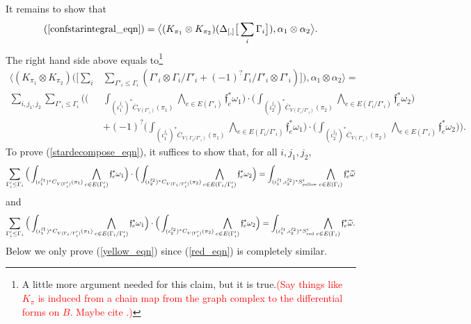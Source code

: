 \documentclass[11pt]{article}
\theoremstyle{definition}
\theoremstyle{remark}
\def\wt#1{\widetilde{#1}}
\def\ov#1{\overline{#1}}
\def\sred{{\textnormal{red}}}
\def\syellow{{\textnormal{yellow}}}
\def\ff{\mathfrak{f}}
\def\cmt#1{\textcolor{red}{(#1)}}
\begin{document}
It remains to show that 
\begin{equation}\label{stardecompose_eqn}
(\ref{confstarintegral_eqn})=\big\langle (K_{\pi_1}\otimes K_{\pi_2})(\Delta_{[,]}\big[\sum_{i}\Gamma_i\big]), \alpha_1\otimes\alpha_2 \big\rangle. 
\end{equation}
The right hand side above equals to\footnote{
A little more argument needed for this claim, but it is true.\cmt{Say things like $K_\pi$ is induced from a chain map from the graph complex to the differential forms on $B$. Maybe cite \cite[Theorem 2.15(1)]{WatanabeAddendum}.}} 
\begin{align*}
\big\langle (K_{\pi_1}\otimes K_{\pi_2})(\big[\sum_{i}&\sum_{\Gamma'_i\le\Gamma_i}(\Gamma'_i\otimes\Gamma_i/\Gamma'_i+(-1)^?\Gamma_i/\Gamma'_i\otimes\Gamma'_i)\big]), \alpha_1\otimes\alpha_2 \big\rangle=\\
\sum_{i,j_1,j_2}\sum_{\Gamma'_i\le\Gamma_i}
\bigg(\Big(&\int_{(\iota_1^{j_1})^*\ov{C}_{V(\Gamma'_i)}(\pi_1)}
\bigwedge_{e\in E(\Gamma'_i)}\ff_e^*\omega_1\Big)
\cdot
\Big(\int_{(\iota_2^{j_2})^*\ov{C}_{V(\Gamma_i/\Gamma'_i)}(\pi_2)}
\bigwedge_{e\in E(\Gamma_i/\Gamma'_i)}\ff_e^*\omega_2\Big)\\
&+(-1)^?
\Big(\int_{(\iota_1^{j_1})^*\ov{C}_{V(\Gamma_i/\Gamma'_i)}(\pi_1)}
\bigwedge_{e\in E(\Gamma_i/\Gamma'_i)}\ff_e^*\omega_1\Big)
\cdot
\Big(\int_{(\iota_2^{j_2})^*\ov{C}_{V(\Gamma'_i)}(\pi_2)}
\bigwedge_{e\in E(\Gamma'_i)}\ff_e^*\omega_2\Big)\bigg).
\end{align*}
To prove (\ref{stardecompose_eqn}), it suffices to show that, for all $i,j_1,j_2$, 
\begin{equation}\label{yellow_eqn}
\sum_{\Gamma'_i\le\Gamma_i}
\Big(\int_{(\iota_1^{j_1})^*{C}_{V(\Gamma'_i)}(\pi_1)}
\bigwedge_{e\in E(\Gamma'_i)}\ff_e^*\omega_1\Big)
\cdot
\Big(\int_{(\iota_2^{j_2})^*{C}_{V(\Gamma_i/\Gamma'_i)}(\pi_2)}
\bigwedge_{e\in E(\Gamma_i/\Gamma'_i)}\ff_e^*\omega_2\Big)=
\int_{(\iota_1^{j_1},\iota_2^{j_2})^*S_{\syellow}^i}\bigwedge_{e\in E(\Gamma_i)}\ff_e^*{\wt\omega}
\end{equation}
and 
\begin{equation}\label{red_eqn}
\sum_{\Gamma'_i\le\Gamma_i}
\Big(\int_{(\iota_1^{j_1})^*{C}_{V(\Gamma_i/\Gamma'_i)}(\pi_1)}
\bigwedge_{e\in E(\Gamma_i/\Gamma'_i)}\ff_e^*\omega_1\Big)
\cdot
\Big(\int_{(\iota_2^{j_2})^*{C}_{V(\Gamma'_i)}(\pi_2)}
\bigwedge_{e\in E(\Gamma'_i)}\ff_e^*\omega_2\Big)=
\int_{(\iota_1^{j_1},\iota_2^{j_2})^*S_{\sred}^i}\bigwedge_{e\in E(\Gamma_i)}\ff_e^*{\wt\omega}. 
\end{equation}
Below we only prove (\ref{yellow_eqn}) since (\ref{red_eqn}) is completely similar. 
\end{document}
